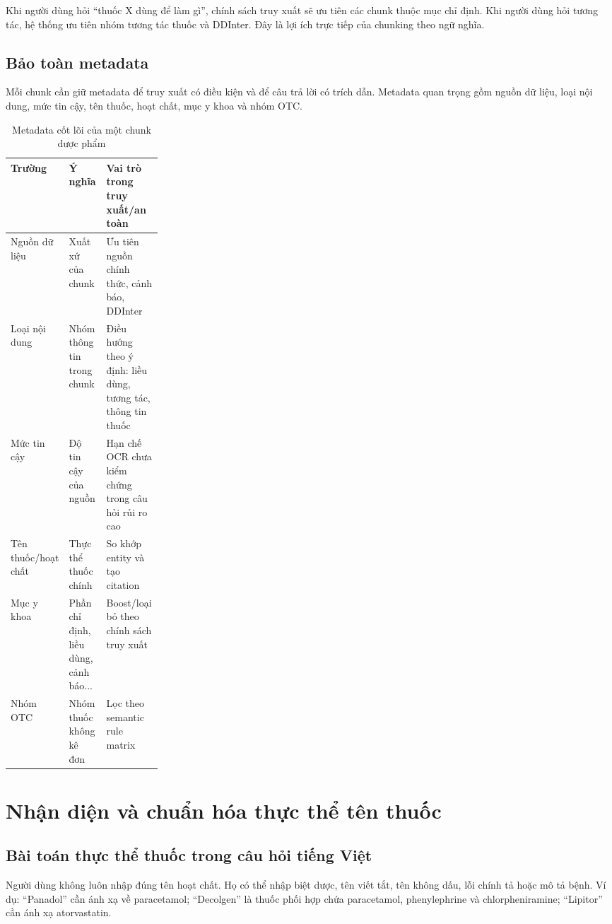 Khi người dùng hỏi ``thuốc X dùng để làm gì'', chính sách truy xuất sẽ ưu tiên các chunk thuộc mục chỉ định. Khi người dùng hỏi tương tác, hệ thống ưu tiên nhóm tương tác thuốc và DDInter. Đây là lợi ích trực tiếp của chunking theo ngữ nghĩa.

\subsection{Bảo toàn metadata}

Mỗi chunk cần giữ metadata để truy xuất có điều kiện và để câu trả lời có trích dẫn. Metadata quan trọng gồm nguồn dữ liệu, loại nội dung, mức tin cậy, tên thuốc, hoạt chất, mục y khoa và nhóm OTC.

\begin{table}[H]
\centering
\small
\caption{Metadata cốt lõi của một chunk dược phẩm}
\begin{tabularx}{\linewidth}{p{0.25\linewidth} Y Y}
\toprule
\textbf{Trường} & \textbf{Ý nghĩa} & \textbf{Vai trò trong truy xuất/an toàn} \\
\midrule
Nguồn dữ liệu & Xuất xứ của chunk & Ưu tiên nguồn chính thức, cảnh báo, DDInter \\
Loại nội dung & Nhóm thông tin trong chunk & Điều hướng theo ý định: liều dùng, tương tác, thông tin thuốc \\
Mức tin cậy & Độ tin cậy của nguồn & Hạn chế OCR chưa kiểm chứng trong câu hỏi rủi ro cao \\
Tên thuốc/hoạt chất & Thực thể thuốc chính & So khớp entity và tạo citation \\
Mục y khoa & Phần chỉ định, liều dùng, cảnh báo... & Boost/loại bỏ theo chính sách truy xuất \\
Nhóm OTC & Nhóm thuốc không kê đơn & Lọc theo semantic rule matrix \\
\bottomrule
\end{tabularx}
\end{table}

\section{Nhận diện và chuẩn hóa thực thể tên thuốc}

\subsection{Bài toán thực thể thuốc trong câu hỏi tiếng Việt}

Người dùng không luôn nhập đúng tên hoạt chất. Họ có thể nhập biệt dược, tên viết tắt, tên không dấu, lỗi chính tả hoặc mô tả bệnh. Ví dụ: ``Panadol'' cần ánh xạ về paracetamol; ``Decolgen'' là thuốc phối hợp chứa paracetamol, phenylephrine và chlorpheniramine; ``Lipitor'' cần ánh xạ atorvastatin.

